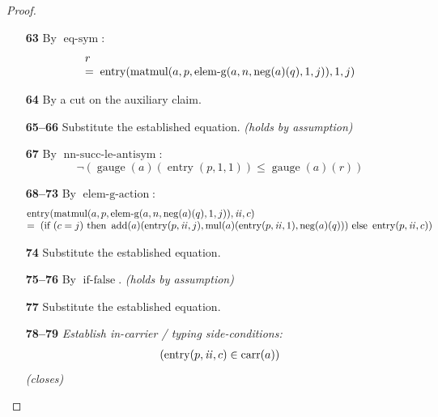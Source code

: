 \documentclass[11pt]{article}
\theoremstyle{plain}
\begin{document}
\begin{proof}
\begin{itemize}[leftmargin=2.8em, itemsep=4pt, parsep=1pt]
  \item[\textbf{63}] By $\operatorname{eq\text{-}sym}$:
\begin{equation*}
\begin{array}{@{}l@{}} r \\ =\; \operatorname{entry}(\operatorname{matmul}(a, p, \operatorname{elem\text{-}g}(a, n, \operatorname{neg}(a)(q), 1, j)), 1, j) \end{array}
\end{equation*}

  \item[\textbf{64}] By a cut on the auxiliary claim.
  \item[\textbf{65--66}] Substitute the established equation.  \emph{(holds by assumption)}
  \item[\textbf{67}] By $\operatorname{nn\text{-}succ\text{-}le\text{-}antisym}$:
\begin{equation*}
\neg (\operatorname{gauge}(a)(\operatorname{entry}(p, 1, 1)) \leq \operatorname{gauge}(a)(r))
\end{equation*}

  \item[\textbf{68--73}] By $\operatorname{elem\text{-}g\text{-}action}$:
\begin{equation*}
\begin{array}{@{}l@{}} \operatorname{entry}(\operatorname{matmul}(a, p, \operatorname{elem\text{-}g}(a, n, \operatorname{neg}(a)(q), 1, j)), \mathit{ii}, c) \\ =\; \left(\text{if }(c = j)\text{ then }\operatorname{add}(a)(\operatorname{entry}(p, \mathit{ii}, j), \operatorname{mul}(a)(\operatorname{entry}(p, \mathit{ii}, 1), \operatorname{neg}(a)(q)))\text{ else }\operatorname{entry}(p, \mathit{ii}, c)\right) \end{array}
\end{equation*}

  \item[\textbf{74}] Substitute the established equation.
  \item[\textbf{75--76}] By $\operatorname{if\text{-}false}$.  \emph{(holds by assumption)}
  \item[\textbf{77}] Substitute the established equation.
  \item[\textbf{78--79}] \emph{Establish in-carrier / typing side-conditions:}
\begin{equation*}
\begin{array}{@{}l@{}}
(\operatorname{entry}(p, \mathit{ii}, c) \in \operatorname{carr}(a))
\end{array}
\end{equation*}
  \emph{(closes)}
\end{itemize}
\end{proof}
\end{document}
